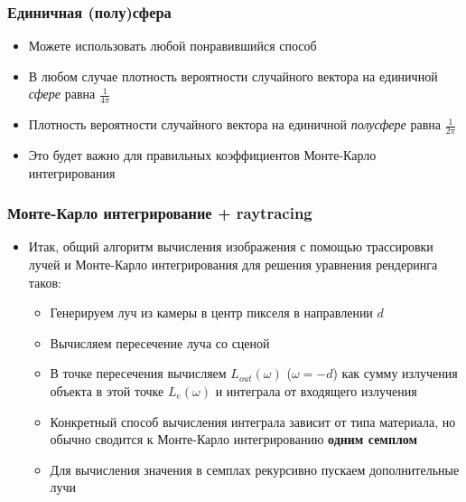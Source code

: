 \documentclass[10pt]{beamer}
\begin{document}
\begin{frame}[fragile]
\frametitle{Единичная (полу)сфера}
\begin{itemize}
\item Можете использовать любой понравившийся способ
\pause
\item В любом случае плотность вероятности случайного вектора на единичной \textit{сфере} равна \begin{math}\frac{1}{4\pi}\end{math}
\pause
\item Плотность вероятности случайного вектора на единичной \textit{полусфере} равна \begin{math}\frac{1}{2\pi}\end{math}
\pause
\item Это будет важно для правильных коэффициентов Монте-Карло интегрирования
\end{itemize}
\end{frame}

\begin{frame}[fragile]
\frametitle{Монте-Карло интегрирование + raytracing}
\begin{itemize}
\item Итак, общий алгоритм вычисления изображения с помощью трассировки лучей и Монте-Карло интегрирования для решения уравнения рендеринга таков:
\pause
\begin{itemize}
\item Генерируем луч из камеры в центр пикселя в направлении \begin{math}d\end{math}
\pause
\item Вычисляем пересечение луча со сценой
\pause
\item В точке пересечения вычисляем \begin{math}L_{out}(\omega)\end{math} (\begin{math}\omega=-d\end{math}) как сумму излучения объекта в этой точке \begin{math}L_e(\omega)\end{math} и интеграла от входящего излучения
\pause
\item Конкретный способ вычисления интеграла зависит от типа материала, но обычно сводится к Монте-Карло интегрированию \textbf{одним семплом}
\pause
\item Для вычисления значения в семплах рекурсивно пускаем дополнительные лучи
\end{itemize}
\end{itemize}
\end{frame}
\end{document}
